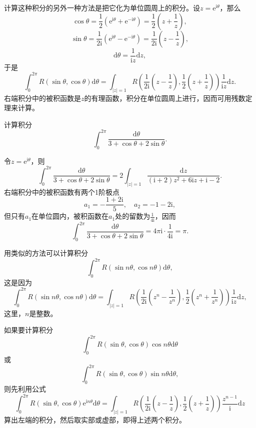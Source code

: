 \documentclass[../../main.tex]{subfiles}
\begin{document}
计算这种积分的另外一种方法是把它化为单位圆周上的积分。设\( z = \mathrm{e}^{\mathrm{i}\theta} \)，那么
\[
\cos\theta = \frac{1}{2} (\mathrm{e}^{\mathrm{i}\theta} + \mathrm{e}^{-\mathrm{i}\theta}) = \frac{1}{2} \left( z + \frac{1}{z} \right),
\]
\[
\sin\theta = \frac{1}{2\mathrm{i}} (\mathrm{e}^{\mathrm{i}\theta} - \mathrm{e}^{-\mathrm{i}\theta}) = \frac{1}{2\mathrm{i}} \left( z - \frac{1}{z} \right),
\]
\[
\mathrm{d}\theta = \frac{1}{\mathrm{i}z} \mathrm{d}z,
\]
于是
\[
\int_{0}^{2\pi} R(\sin\theta, \cos\theta) \mathrm{d}\theta = \int_{|z| = 1} R\left( \frac{1}{2\mathrm{i}} \left( z - \frac{1}{z} \right), \frac{1}{2} \left( z + \frac{1}{z} \right) \right) \frac{1}{\mathrm{i}z} \mathrm{d}z.
\]
右端积分中的被积函数是\( z \)的有理函数，积分在单位圆周上进行，因而可用残数定理来计算。

\begin{example}
计算积分
\[
\int_{0}^{2\pi} \frac{\mathrm{d}\theta}{3 + \cos\theta + 2\sin\theta}.
\]
\end{example}
\begin{solution}
令\( z = \mathrm{e}^{\mathrm{i}\theta} \)，则
\[
\int_{0}^{2\pi} \frac{\mathrm{d}\theta}{3 + \cos\theta + 2\sin\theta} = 2 \int_{|z| = 1} \frac{\mathrm{d}z}{(\mathrm{i} + 2)z^2 + 6\mathrm{i}z + \mathrm{i} - 2}.
\]
右端积分中的被积函数有两个1阶极点
\[
a_1 = -\frac{1 + 2\mathrm{i}}{5}, \quad a_2 = -1 - 2\mathrm{i},
\]
但只有\( a_1 \)在单位圆内，被积函数在\( a_1 \)处的留数为\( \frac{1}{4\mathrm{i}} \)，因而
\[
\int_{0}^{2\pi} \frac{\mathrm{d}\theta}{3 + \cos\theta + 2\sin\theta} = 4\pi \mathrm{i} \cdot \frac{1}{4\mathrm{i}}
= \pi.
\]

\end{solution}

用类似的方法可以计算积分
\[
\int_{0}^{2\pi} R(\sin n\theta, \cos n\theta) \mathrm{d}\theta,
\]
这是因为
\[
\int_{0}^{2\pi} R(\sin n\theta, \cos n\theta) \mathrm{d}\theta = \int_{|z| = 1} R\left( \frac{1}{2\mathrm{i}} \left( z^n - \frac{1}{z^n} \right), \frac{1}{2} \left( z^n + \frac{1}{z^n} \right) \right) \frac{1}{\mathrm{i}z} \mathrm{d}z,
\]
这里，\( n \)是整数。

如果要计算积分
\[
\int_{0}^{2\pi} R(\sin\theta, \cos\theta) \cos n\theta \mathrm{d}\theta
\]
或
\[
\int_{0}^{2\pi} R(\sin\theta, \cos\theta) \sin n\theta \mathrm{d}\theta,
\]
则先利用公式
\[
\int_{0}^{2\pi} R(\sin\theta, \cos\theta) \mathrm{e}^{\mathrm{i}n\theta} \mathrm{d}\theta = \int_{|z| = 1} R\left( \frac{1}{2\mathrm{i}} \left( z - \frac{1}{z} \right), \frac{1}{2} \left( z + \frac{1}{z} \right) \right) \frac{z^{n - 1}}{\mathrm{i}} \mathrm{d}z \label{formula10}
\]
算出左端的积分，然后取实部或虚部，即得上述两个积分。
\end{document}
